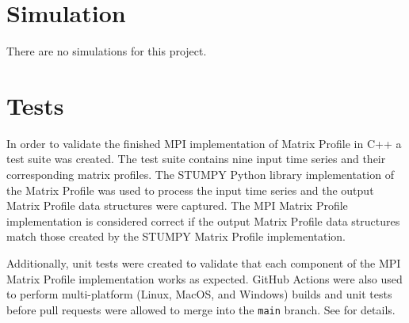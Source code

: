 \documentclass[conference]{IEEEtran}
\begin{document}
\section{Simulation}
There are no simulations for this project.

\section{Tests}
In order to validate the finished MPI implementation of Matrix Profile in C++ a test suite was created.  The test suite contains nine input time series and their corresponding matrix profiles.  The STUMPY\cite{Stumpy} Python library implementation of the Matrix Profile was used to process the input time series and the output Matrix Profile data structures were captured.  The MPI Matrix Profile implementation is considered correct if the output Matrix Profile data structures match those created by the STUMPY Matrix Profile implementation. 

Additionally, unit tests were created to validate that each component of the MPI Matrix Profile implementation works as expected.  GitHub Actions were also used to perform multi-platform (Linux, MacOS, and Windows) builds and unit tests before pull requests were allowed to merge into the \texttt{main} branch.  See \cite{GroupProject} for details.
\end{document}
